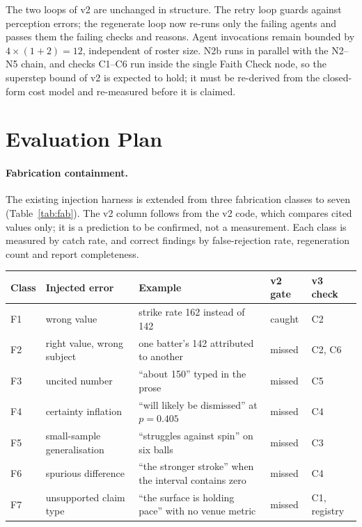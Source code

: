 \documentclass[11pt,a4paper]{article}
\begin{document}
The two loops of v2 are unchanged in structure. The retry loop guards against
perception errors; the regenerate loop now re-runs only the failing agents and
passes them the failing checks and reasons. Agent invocations remain bounded by
$4 \times (1 + 2) = 12$, independent of roster size. N2b runs in parallel with
the N2--N5 chain, and checks C1--C6 run inside the single Faith Check node, so
the superstep bound of v2 is expected to hold; it must be re-derived from the
closed-form cost model and re-measured before it is claimed.

\section{Evaluation Plan}

\paragraph{Fabrication containment.} The existing injection harness is extended
from three fabrication classes to seven (Table~\ref{tab:fab}). The v2 column
follows from the v2 code, which compares cited values only; it is a prediction
to be confirmed, not a measurement. Each class is measured by catch rate, and
correct findings by false-rejection rate, regeneration count and report
completeness.

\begin{center}
\footnotesize
\renewcommand{\arraystretch}{1.2}
\begin{tabular}{@{}>{\raggedright\arraybackslash}p{1.0cm}
                  >{\raggedright\arraybackslash}p{3.2cm}
                  >{\raggedright\arraybackslash}p{5.2cm}
                  >{\raggedright\arraybackslash}p{2.0cm}
                  >{\raggedright\arraybackslash}p{2.2cm}@{}}
\toprule
\textbf{Class} & \textbf{Injected error} & \textbf{Example} & \textbf{v2 gate} & \textbf{v3 check} \\
\midrule
F1 & wrong value & strike rate 162 instead of 142 & caught & C2 \\
F2 & right value, wrong subject & one batter's 142 attributed to another & missed & C2, C6 \\
F3 & uncited number & ``about 150'' typed in the prose & missed & C5 \\
F4 & certainty inflation & ``will likely be dismissed'' at $p = 0.405$ & missed & C4 \\
F5 & small-sample generalisation & ``struggles against spin'' on six balls & missed & C3 \\
F6 & spurious difference & ``the stronger stroke'' when the interval contains zero & missed & C4 \\
F7 & unsupported claim type & ``the surface is holding pace'' with no venue metric & missed & C1, registry \\
\bottomrule
\end{tabular}
\label{tab:fab}
\end{center}
\end{document}
